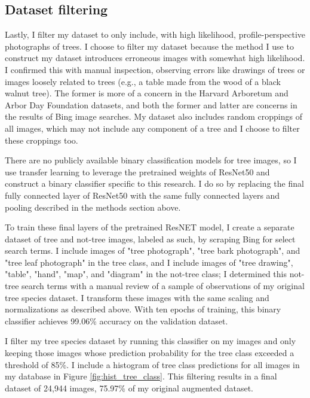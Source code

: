 \documentclass[10pt,twocolumn,letterpaper]{article}
\begin{document}
\subsection{Dataset filtering}

Lastly, I filter my dataset to only include, with high likelihood, profile-perspective photographs of trees. I choose to filter my dataset because the method I use to construct my dataset introduces erroneous images with somewhat high likelihood. I confirmed this with manual inspection, observing errors like drawings of trees or images loosely related to trees (e.g., a table made from the wood of a black walnut tree). The former is more of a concern in the Harvard Arboretum and Arbor Day Foundation datasets, and both the former and latter are concerns in the results of Bing image searches. My dataset also includes random croppings of all images, which may not include any component of a tree and I choose to filter these croppings too.

There are no publicly available binary classification models for tree images, so I use transfer learning to leverage the pretrained weights of ResNet50 and construct a binary classifier \cite{ResNET} specific to this research. I do so by replacing the final fully connected layer of ResNet50 with the same fully connected layers and pooling described in the methods section above.

To train these final layers of the pretrained ResNET model, I create a separate dataset of tree and not-tree images, labeled as such, by scraping Bing for select search terms. I include images of "tree photograph", "tree bark photograph", and "tree leaf photograph" in the tree class, and I include images of "tree drawing", "table", "hand", "map", and "diagram" in the not-tree class; I determined this not-tree search terms with a manual review of a sample of observations of my original tree species dataset. I transform these images with the same scaling and normalizations as described above. With ten epochs of training, this binary classifier achieves 99.06\% accuracy on the validation dataset. 

I filter my tree species dataset by running this classifier on my images and only keeping those images whose prediction probability for the tree class exceeded a threshold of 85\%. I include a histogram of tree class predictions for all images in my database in Figure \ref{fig:hist_tree_class}. This filtering results in a final dataset of 24,944 images, 75.97\% of my original augmented dataset.
\end{document}
